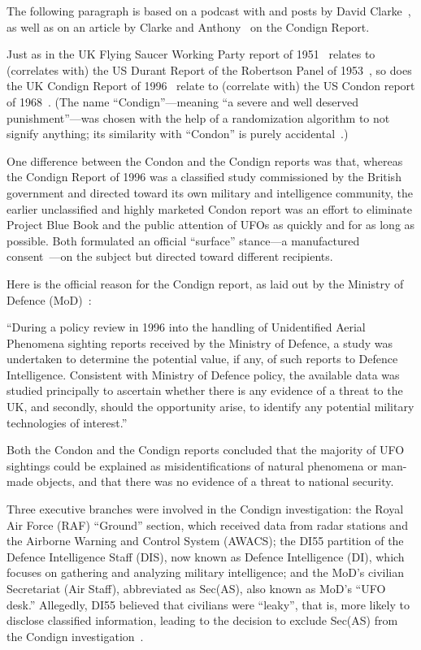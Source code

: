 The following paragraph is based on a podcast with and posts by David Clarke~\cite{Clarke2022Nov,BibEntry2018May},
as well as on an article by Clarke and Anthony~\cite{Clarke-Anthony-IUR-Condign} on the Condign Report.

Just as in the UK Flying Saucer Working Party report of 1951~\cite{FSWP1951} relates to
(correlates with) the US Durant Report of the Robertson Panel of 1953~\cite{RobertsonPanelDurantReport},
so does the UK Condign Report of 1996~\cite{CondignReport} relate to
(correlate with) the US Condon report of 1968~\cite{Condon-report,Condon-report-Bantam,Condon-report-Dutton,BibEntry2023Jan}.
(The name ``Condign''---meaning ``a severe and well deserved punishment''---was chosen with the help of a randomization algorithm to not signify anything;
its similarity with ``Condon'' is purely accidental~\cite{Clarke2022Nov}.)

One difference between the Condon and the Condign reports was that, whereas
the Condign Report of 1996 was a classified study commissioned by the British government and directed toward its own military and intelligence community,
the earlier unclassified and highly marketed Condon report was an effort to eliminate Project Blue Book and the public attention of UFOs as quickly and for as long as possible.
Both formulated an official ``surface'' stance---a manufactured consent~\cite{Herman2002Jan}---on the subject but directed toward different recipients.

Here is the official reason for the Condign report, as laid out by the Ministry of Defence (MoD)~\cite{CondignReport}:
\begin{svgraybox}
``During a policy review in 1996 into the handling of Unidentified Aerial Phenomena sighting reports received by the Ministry of Defence,
 a study was undertaken to determine the potential value, if any, of such reports to Defence Intelligence.
Consistent with Ministry of Defence policy, the available data was studied principally to ascertain whether
there is any evidence of a threat to the UK, and secondly, should the opportunity arise, to identify any potential military technologies of interest.''
\end{svgraybox}
Both the Condon and the Condign reports concluded that the majority of UFO sightings could be explained as misidentifications of natural phenomena or man-made objects,
and that there was no evidence of a threat to national security.

Three executive branches were involved in the Condign investigation: the Royal Air Force (RAF) ``Ground'' section, which received data from radar stations and the Airborne Warning and Control System (AWACS); the DI55 partition of the Defence Intelligence Staff (DIS), now known as Defence Intelligence (DI), which focuses on gathering and analyzing military intelligence; and the MoD's civilian Secretariat (Air Staff), abbreviated as Sec(AS), also known as MoD's ``UFO desk.'' Allegedly, DI55 believed that civilians were ``leaky'',
that is, more likely to disclose classified information, leading to the decision to exclude Sec(AS) from the Condign investigation~\cite{BibEntry2018May}.

